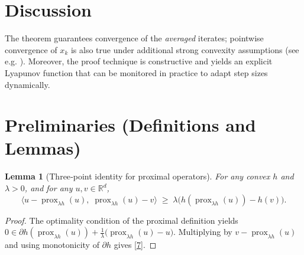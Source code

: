 \documentclass{article}
\newtheorem{lemma}{Lemma}
\newcommand{\prox}{\operatorname{prox}}
\newcommand{\R}{\mathbb{R}}
\begin{document}
\section*{Discussion}
The theorem guarantees convergence of the \emph{averaged} iterates; pointwise convergence of $x_{k}$ is also true under additional strong convexity assumptions (see e.g. \cite{chambolle2011first}). Moreover, the proof technique is constructive and yields an explicit Lyapunov function that can be monitored in practice to adapt step sizes dynamically.

\newpage
\section*{Preliminaries (Definitions and Lemmas)}
\begin{lemma}[Three‑point identity for proximal operators]\label{lem:prox}
For any convex $h$ and $\lambda>0$, and for any $u,v\in\R^{d}$,
\[
\langle u-\prox_{\lambda h}(u),\; \prox_{\lambda h}(u)-v\rangle
\;\ge\;
\lambda\bigl(h(\prox_{\lambda h}(u))-h(v)\bigr).
\tag{7}
\]
\end{lemma}
\begin{proof}
The optimality condition of the proximal definition yields  
$0\in \partial h(\prox_{\lambda h}(u))+\frac{1}{\lambda}\bigl(\prox_{\lambda h}(u)-u\bigr)$.  
Multiplying by $v-\prox_{\lambda h}(u)$ and using monotonicity of $\partial h$ gives \eqref{7}. \qedhere
\end{proof}
\end{document}
